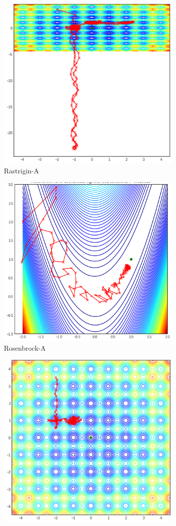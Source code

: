 \documentclass[conference]{IEEEtran}
\begin{document}
\begin{figure}[!t]
\begin{subfigure}{.275\textwidth}
  \centering
  \includegraphics[width=.6\linewidth]{rastrigina.png}
  \caption{Rastrigin-A}
  \label{fig:figur:13}
\end{subfigure}%
\begin{subfigure}{.275\textwidth}
  \centering
  \includegraphics[width=.6\linewidth]{rosenbrocka.png}
  \caption{Rosenbrock-A}
  \label{fig:figur:14}
\end{subfigure}
\begin{subfigure}{.275\textwidth}
  \centering
  \includegraphics[width=.6\linewidth]{rastriginb.png}

\end{subfigure}
\end{figure}
\end{document}
